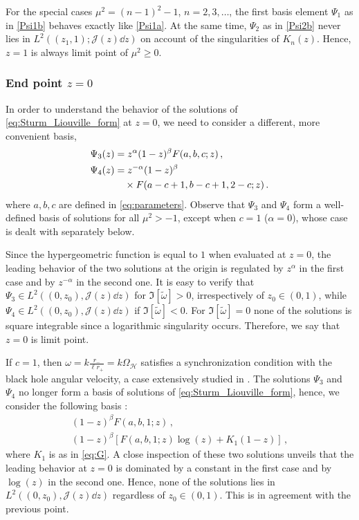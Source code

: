 \documentclass[aps, prd, amsmath, floats, floatfix, twocolumn, nofootinbib, superscriptaddress, showpacs]{revtex4-1}
\begin{document}
	For the special cases $\mu^2=(n-1)^2-1$, $n=2,3,\ldots$, the first basis element $\Psi_1$ as in \eqref{Psi1b} behaves exactly like \eqref{Psi1a}. At the same time, $\Psi_2$ as in \eqref{Psi2b} never lies in $L^2((z_1,1);\mathcal{J}(z)\dd z)$ on account of the singularities of $K_n(z)$. Hence, $z=1$ is always limit point of $\mu^2 \geqslant 0$.



\subsubsection{End point $z=0$}
\label{sec:endpoint0}

	In order to understand the behavior of the solutions of \eqref{eq:Sturm_Liouville_form} at $z=0$, we need to consider a different, more convenient basis,
	\begin{subequations} \label{Psi0}
	\begin{align}
	\Psi_3(z) &= z^\alpha(1-z)^\beta F(a,b,c;z) \, , \label{Psi10}  \\
	\Psi_4(z) &= z^{-\alpha}(1-z)^\beta \notag \\
	&\quad \times F(a-c+1,b-c+1,2-c;z)  \label{Psi20} \, .
	\end{align}
	\end{subequations}
	where $a,b,c$ are defined in \eqref{eq:parameters}. Observe that $\Psi_3$ and $\Psi_4$ form a well-defined basis of solutions for all $\mu^2 > -1$, except when $c=1$ ($\alpha = 0$), whose case is dealt with separately below.
	
	Since the hypergeometric function is equal to $1$ when evaluated at $z=0$, the leading behavior of the two solutions at the origin is regulated by $z^\alpha$ in the first case and by $z^{-\alpha}$ in the second one. It is easy to verify that $\Psi_3 \in L^2((0,z_0),\mathcal{J}(z)\dd z)$ for $\Im[\tilde{\omega}]>0$, irrespectively of $z_0\in(0,1)$, while $\Psi_4 \in L^2((0,z_0),\mathcal{J}(z)\dd z)$ if $\Im[\tilde{\omega}]<0$. For $\Im[\tilde{\omega}]=0$ none of the solutions is square integrable since a logarithmic singularity occurs. Therefore, we say that $z=0$ is limit point.  

If $c=1$, then $\omega=k\frac{r_-}{\ell r_+} = k \Omega_{\mathcal{H}}$ satisfies a synchronization condition with the black hole angular velocity, a case extensively studied in \cite{Ferreira:2017}. The solutions $\Psi_3$ and $\Psi_4$ no longer form a basis of solutions of \eqref{eq:Sturm_Liouville_form}, hence, we consider the following basis \cite[\S 15.10.8]{NIST}:
	\begin{subequations}
	\begin{gather*}
	(1-z)^\beta F(a,b,1;z) \, ,  \label{Psi01b} \\
	(1-z)^\beta\left[F(a,b,1;z)\log(z)+K_1(1-z)\right] \, , \label{Psi02b}
	\end{gather*}
	\end{subequations}
where $K_1$ is as in \eqref{eq:G}. A close inspection of these two solutions unveils that the leading behavior at $z=0$ is dominated by a constant in the first case and by $\log (z)$ in the second one. Hence, none of the solutions lies in $L^2((0,z_0),\mathcal{J}(z)\dd z)$ regardless of $z_0\in(0,1)$. This is in agreement with the previous point.
\end{document}
